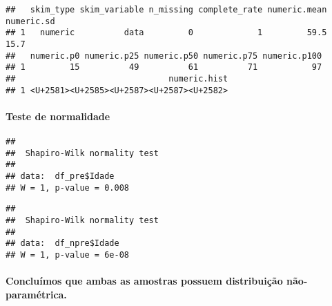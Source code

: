 \documentclass[
]{article}
\newenvironment{Shaded}{\begin{snugshade}}{\end{snugshade}}
\newcommand{\CommentTok}[1]{\textcolor[rgb]{0.56,0.35,0.01}{\textit{#1}}}
\newcommand{\FunctionTok}[1]{\textcolor[rgb]{0.00,0.00,0.00}{#1}}
\newcommand{\NormalTok}[1]{#1}
\newcommand{\SpecialCharTok}[1]{\textcolor[rgb]{0.00,0.00,0.00}{#1}}
\begin{document}
\begin{Shaded}
\end{Shaded}

\begin{verbatim}
##   skim_type skim_variable n_missing complete_rate numeric.mean numeric.sd
## 1   numeric          data         0             1         59.5       15.7
##   numeric.p0 numeric.p25 numeric.p50 numeric.p75 numeric.p100
## 1         15          49          61          71           97
##                               numeric.hist
## 1 <U+2581><U+2585><U+2587><U+2587><U+2582>
\end{verbatim}

\hypertarget{teste-de-normalidade}{%
\paragraph{\texorpdfstring{\textbf{Teste de
normalidade}}{Teste de normalidade}}\label{teste-de-normalidade}}

\begin{Shaded}
\end{Shaded}

\begin{verbatim}
## 
##  Shapiro-Wilk normality test
## 
## data:  df_pre$Idade
## W = 1, p-value = 0.008
\end{verbatim}

\begin{Shaded}
\end{Shaded}

\begin{verbatim}
## 
##  Shapiro-Wilk normality test
## 
## data:  df_npre$Idade
## W = 1, p-value = 6e-08
\end{verbatim}

\hypertarget{concluuxedmos-que-ambas-as-amostras-possuem-distribuiuxe7uxe3o-nuxe3o-paramuxe9trica.}{%
\paragraph{\texorpdfstring{\textbf{Concluímos que ambas as amostras
possuem distribuição
não-paramétrica.}}{Concluímos que ambas as amostras possuem distribuição não-paramétrica.}}\label{concluuxedmos-que-ambas-as-amostras-possuem-distribuiuxe7uxe3o-nuxe3o-paramuxe9trica.}}
\end{document}
